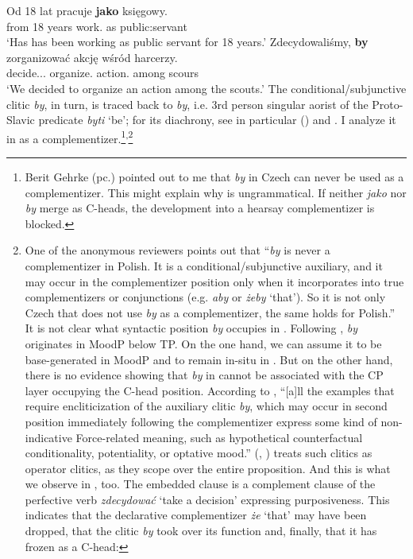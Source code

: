 \documentclass[output=paper
,modfonts
,nonflat]{langsci/langscibook}
\begin{document}
\ea \ea \gll	Od 18 lat pracuje \textbf{jako} księgowy. \\
		from 18 years work.{\thirdperson}{\sg} as {public:servant} \\
		\glt	`Has has been working as public servant for 18 years.' 
		\ex\gll		Zdecydowaliśmy, \textbf{by} zorganizować akcję wśród harcerzy. \label{pasek} \\
	            decide.{\lptcp}.{\vir}.{\firstperson}{\pl} {\subj} organize.{\infv} action.{\acc} among scours \\
		\glt	 `We decided to organize an action among the scouts.' 
    \z\z		
The conditional\slash subjunctive clitic \emph{by}, in turn, is traced back to \*\emph{by}, i.e. 3rd person singular aorist of the Proto-Slavic predicate \*\emph{byti} `be'; for its diachrony, see in particular \citeauthor{Migdalski2016} (\citeyear{Migdalski2006, Migdalski2009, Migdalski2016}) and \textcite{Willis2000}. I analyze it in  as a complementizer.\footnote{Berit Gehrke (pc.) pointed out to me that \emph{by} in Czech can never be used as a complementizer. This might explain why  is ungrammatical. If neither \emph{jako} nor \emph{by} merge as C-heads, the development into a hearsay complementizer is blocked.
}\textsuperscript{,}\footnote{One of the anonymous reviewers points out that ``\emph{by} is never a complementizer in Polish. It is a conditional\slash subjunctive auxiliary, and it may occur in the complementizer position only when it incorporates into true complementizers or conjunctions (e.g. \emph{aby} or \emph{żeby} `that'). So it is not only Czech that does not use \emph{by} as a complementizer, the same holds for Polish.'' It is not clear what syntactic position \emph{by} occupies in . Following \textcite{Migdalski2006}, \emph{by} originates in MoodP below TP. On the one hand, we can assume it to be base-generated in MoodP and to remain in-situ in . But on the other hand, there is no evidence showing that \emph{by} in   cannot be associated with the CP layer occupying the C-head position. According to  \textcite[171]{Migdalski2016}, ``[a]ll the examples that require encliticization of the auxiliary clitic \emph{by}, which may occur in second position immediately following the complementizer express some kind of non-indicative Force-related meaning, such as hypothetical counterfactual conditionality, potentiality, or optative mood.'' \citeauthor{Tomic2001} (\citeyear{Tomic2000}, \citeyear{Tomic2001}) treats such clitics as operator clitics, as they scope over the entire proposition. And this is what we observe in , too. The embedded clause is a complement clause of the perfective verb \emph{zdecydować} `take a decision' expressing purposiveness. This indicates that the declarative complementizer \emph{że} `that' may have been dropped, that the clitic \emph{by} took over its function and, finally, that it has frozen as a C-head:         

}
\end{document}

